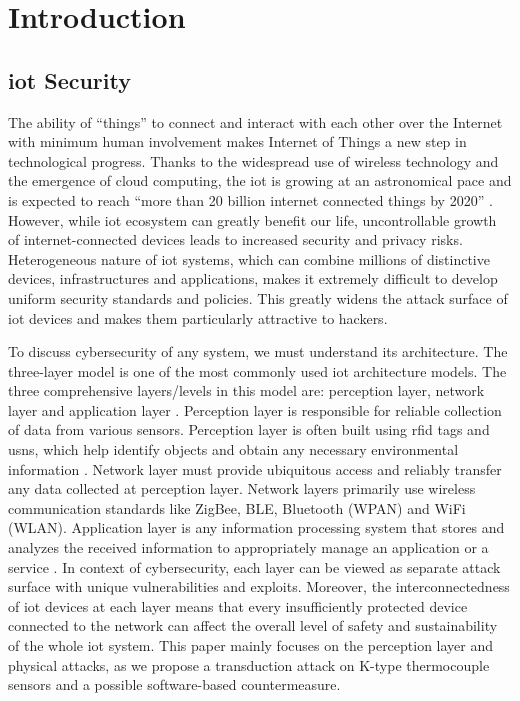 \section{Introduction}

\subsection{\ac{iot} Security}

The ability of ``things'' to connect and interact with each other over the Internet with minimum human involvement makes Internet of Things a new step in technological progress. Thanks to the widespread use of wireless technology and the emergence of cloud computing, the \ac{iot} is growing at an astronomical pace and is expected to reach ``more than 20 billion internet connected things by 2020'' \cite{Gartner17}. However, while \ac{iot} ecosystem can greatly benefit our life, uncontrollable growth of internet-connected devices leads to increased security and privacy risks. Heterogeneous nature of \ac{iot} systems, which can combine millions of distinctive devices, infrastructures and applications, makes it extremely difficult to develop uniform security standards and policies. This greatly widens the attack surface of \ac{iot} devices and makes them particularly attractive to hackers. 

To discuss cybersecurity of any system, we must understand its architecture. The three-layer model is one of the most commonly used \ac{iot} architecture models. The three comprehensive layers/levels in this model are: perception layer, network layer and application layer \cite{Mendez17,Deogirikar17,Krishna17}. Perception layer is responsible for reliable collection of data from various sensors. Perception layer is often built using \ac{rfid} tags and \acp{usn}, which help identify objects and obtain any necessary environmental information \cite{Devera14,Deng12}. Network layer must provide ubiquitous access and reliably transfer any data collected at perception layer. Network layers primarily use wireless communication standards like ZigBee, BLE, Bluetooth (WPAN) and WiFi (WLAN). Application layer is any information processing system that stores and analyzes the received information to appropriately manage an application or a service \cite{Yang17}. In context of cybersecurity, each layer can be viewed as separate attack surface with unique vulnerabilities and exploits. Moreover, the interconnectedness of \ac{iot} devices at each layer means that every insufficiently protected device connected to the network can affect the overall level of safety and sustainability of the whole \ac{iot} system. This paper mainly focuses on the perception layer and physical attacks, as we propose a transduction attack on K-type thermocouple sensors and a possible software-based countermeasure. 

